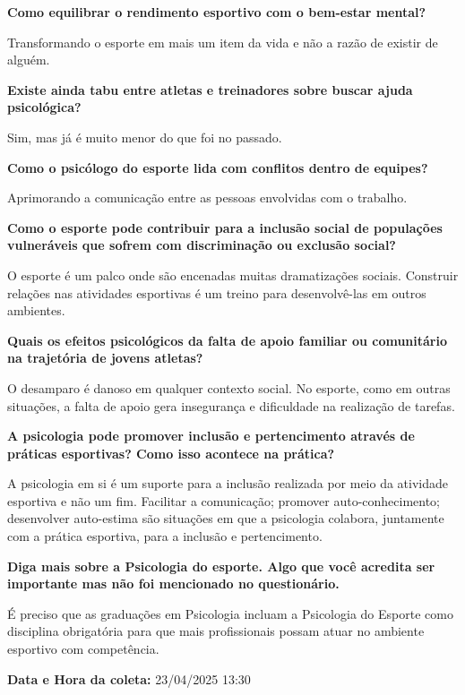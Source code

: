 \textbf{Como equilibrar o rendimento esportivo com o bem-estar mental?}

Transformando o esporte em mais um item da vida e não a razão de existir de alguém.

\textbf{Existe ainda tabu entre atletas e treinadores sobre buscar ajuda psicológica?}

Sim, mas já é muito menor do que foi no passado.

\textbf{Como o psicólogo do esporte lida com conflitos dentro de equipes?}

Aprimorando a comunicação entre as pessoas envolvidas com o trabalho.

\textbf{Como o esporte pode contribuir para a inclusão social de populações vulneráveis que sofrem com discriminação ou exclusão social?}

O esporte é um palco onde são encenadas muitas dramatizações sociais. Construir relações nas atividades esportivas é um treino para desenvolvê-las em outros ambientes.

\textbf{Quais os efeitos psicológicos da falta de apoio familiar ou comunitário na trajetória de jovens atletas?}

O desamparo é danoso em qualquer contexto social. No esporte, como em outras situações, a falta de apoio gera insegurança e dificuldade na realização de tarefas.

\textbf{A psicologia pode promover inclusão e pertencimento através de práticas esportivas? Como isso acontece na prática?}

A psicologia em si é um suporte para a inclusão realizada por meio da atividade esportiva e não um fim. Facilitar a comunicação; promover auto-conhecimento; desenvolver auto-estima são situações em que a psicologia colabora, juntamente com a prática esportiva, para a inclusão e pertencimento.

\textbf{Diga mais sobre a Psicologia do esporte. Algo que você acredita ser importante mas não foi mencionado no questionário.}

É preciso que as graduações em Psicologia incluam a Psicologia do Esporte como disciplina obrigatória para que mais profissionais possam atuar no ambiente esportivo com competência.

\textbf{Data e Hora da coleta:} 23/04/2025 13:30
